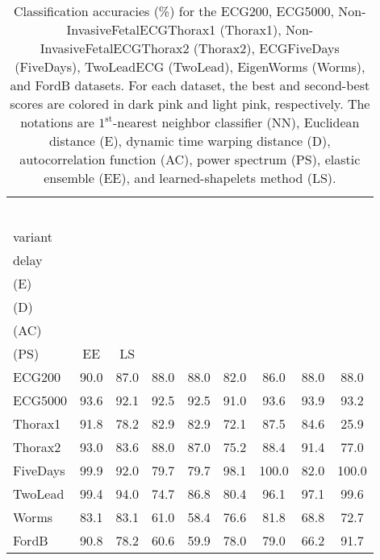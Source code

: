 \documentclass[twocolumn,pre,amsmath,amssymb]{revtex4-1}
\newcommand{\rst}{\cellcolor[RGB]{240, 153, 149}}
\newcommand{\rnd}{\cellcolor[RGB]{249, 207, 205}}
\newcommand{\st}{\shortstack}
\begin{document}
\begin{table}
	\caption{\label{tab:acc} Classification accuracies (\%) for the ECG200, ECG5000, 
	Non-InvasiveFetalECGThorax1 (Thorax1), Non-InvasiveFetalECGThorax2 (Thorax2),
	ECGFiveDays (FiveDays), TwoLeadECG (TwoLead), 
	EigenWorms (Worms), and FordB datasets. 
		For each dataset, the best and second-best scores are colored in dark pink and light pink, respectively. 
		The notations are  $1^{\text{st}}$-nearest neighbor classifier (NN), 
		Euclidean distance (E), dynamic time warping distance (D), autocorrelation function (AC), 
		power spectrum (PS), elastic ensemble (EE), and learned-shapelets method (LS).}
	\begin{ruledtabular}
		\begin{tabular}{lcccccccc}
			\st{Data\\~}     &\textbf{\st{Delay\\variant}} &\st{Single\\delay} &\st{NN\\(E)} &\st{NN\\(D)} &\st{NN\\(AC)}  &\st{NN\\(PS)}        &EE       &LS      \\ \hline
			ECG200   &\rst 90.0                  &87.0               &\rnd 88.0          &\rnd 88.0          &82.0 &86.0  &\rnd 88.0  &\rnd 88.0\\
            ECG5000  &\rnd 93.6                  &92.1               &92.5          &92.5          &91.0 &\rnd 93.6  &\rst 93.9  &93.2\\
			Thorax1  &\rst 91.8                  &78.2               &82.9          &82.9          &72.1 &\rnd 87.5  &84.6       &25.9\\
			Thorax2  &\rst 93.0                  &83.6               &88.0          &87.0          &75.2 &88.4       &\rnd 91.4  &77.0\\
            FiveDays &\rnd 99.9                  &92.0               &79.7          &79.7          &98.1 &\rst 100.0 &82.0       &\rst 100.0\\
			TwoLead  &\rnd 99.4                  &94.0               &74.7          &86.8          &80.4 &96.1       &97.1       &\rst 99.6\\
			Worms &\rst 83.1                &\rst 83.1               &61.0          &58.4          &76.6 &\rnd 81.8  &68.8       &72.7\\
			FordB      &\rnd 90.8                &78.2                  &60.6          &59.9          &78.0 &79.0  &66.2       &\rst 91.7\\
		\end{tabular}
	\end{ruledtabular}
\end{table}
\end{document}
